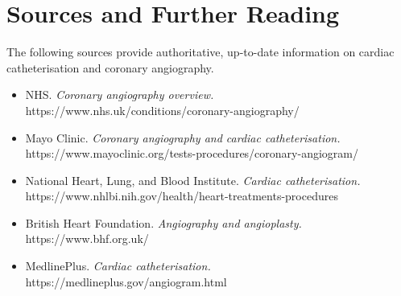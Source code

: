 \section*{Sources and Further Reading}
The following sources provide authoritative, up-to-date information on cardiac catheterisation and coronary angiography.
\begin{itemize}
    \item NHS. \textit{Coronary angiography overview.} https://www.nhs.uk/conditions/coronary-angiography/
    \item Mayo Clinic. \textit{Coronary angiography and cardiac catheterisation.} https://www.mayoclinic.org/tests-procedures/coronary-angiogram/
    \item National Heart, Lung, and Blood Institute. \textit{Cardiac catheterisation.} https://www.nhlbi.nih.gov/health/heart-treatments-procedures
    \item British Heart Foundation. \textit{Angiography and angioplasty.} https://www.bhf.org.uk/
    \item MedlinePlus. \textit{Cardiac catheterisation.} https://medlineplus.gov/angiogram.html
\end{itemize}
